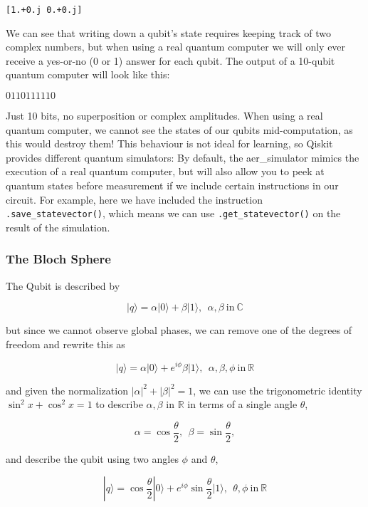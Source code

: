 \documentclass[11pt]{article}
\begin{document}
    \begin{Verbatim}[commandchars=\\\{\}]
[1.+0.j 0.+0.j]
    \end{Verbatim}

    We can see that writing down a qubit's state requires keeping track of
two complex numbers, but when using a real quantum computer we will only
ever receive a yes-or-no (0 or 1) answer for each qubit. The output of a
10-qubit quantum computer will look like this:

\(0110111110\)

Just 10 bits, no superposition or complex amplitudes. When using a real
quantum computer, we cannot see the states of our qubits
mid-computation, as this would destroy them! This behaviour is not ideal
for learning, so Qiskit provides different quantum simulators: By
default, the aer\_simulator mimics the execution of a real quantum
computer, but will also allow you to peek at quantum states before
measurement if we include certain instructions in our circuit. For
example, here we have included the instruction
\texttt{.save\_statevector()}, which means we can use
\texttt{.get\_statevector()} on the result of the simulation.

    \hypertarget{the-bloch-sphere}{%
\subsubsection{The Bloch Sphere}\label{the-bloch-sphere}}

    The Qubit is described by

\[|q\rangle = \alpha|0\rangle + \beta|1\rangle, \ \ \alpha, \beta \  \mathrm{in} \ \mathbb{C} \]

but since we cannot observe global phases, we can remove one of the
degrees of freedom and rewrite this as

\[|q\rangle = \alpha|0\rangle + e^{i\phi}\beta|1\rangle, \ \ \alpha, \beta, \phi \  \mathrm{in} \ \mathbb{R} \]

and given the normalization \(|\alpha|^2 + |\beta|^2 = 1\), we can use
the trigonometric identity \(\sin^2 x + \cos^2 x = 1\) to describe
\(\alpha, \beta\) in \(\mathbb{R}\) in terms of a single angle
\(\theta\),

\[ \alpha = \cos\frac{\theta}{2}, \ \ \beta = \sin\frac{\theta}{2},\]

and describe the qubit using two angles \(\phi\) and \(\theta\),

\[|q\rangle = \cos\frac{\theta}{2}|0\rangle + e^{i\phi}\sin\frac{\theta}{2}|1\rangle, \ \ \theta, \phi \  \mathrm{in} \ \mathbb{R}\]
\end{document}
